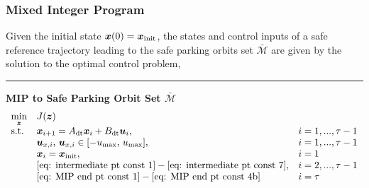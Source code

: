 \documentclass[twocolumn,letterpaper]{IEEEAerospaceCLS}  %
\theoremstyle{definition}
\begin{document}
\subsubsection{ Mixed Integer Program }
Given the initial state $\boldsymbol{x}(0)=\boldsymbol{x}_{\rm init}$, the states and control inputs of a safe reference trajectory leading to the safe parking orbits set $\bar{{\mathcal{M}}}$ are given by the solution to the optimal control problem,

\newpage
\noindent \rule{1\columnwidth}{0.7pt}
\noindent \textbf{MIP to Safe Parking Orbit Set $\bar{{\mathcal{M}}}$}
\begin{equation}
\begin{array}{lll}
\underset{\boldsymbol{z}}{\min} & J(\boldsymbol{z}) & \\
\text{s.t.} & \boldsymbol{x}_{i+1} = A_{\rm dt}\boldsymbol{x}_i + B_{\rm dt} \boldsymbol{u}_i, & i=1,...,\tau-1 \\ 
& \boldsymbol{u}_{x,i}, \, \boldsymbol{u}_{x,i} \in [-u_{\rm max}, \, u_{\rm max}], & i = 1, ..., \tau-1 \\ 
& \boldsymbol{x}_i = \boldsymbol{x}_{\rm init}, & i = 1 \\ 
& \eqref{eq: intermediate pt const 1}-\eqref{eq: intermediate pt const 7}, & i=2,...,\tau-1 \\ 
& \eqref{eq: MIP end pt const 1}-\eqref{eq: MIP end pt const 4b} & i=\tau \\ 
\end{array}\label{eq: MIP to parking orbit set}
\end{equation}
\end{document}
